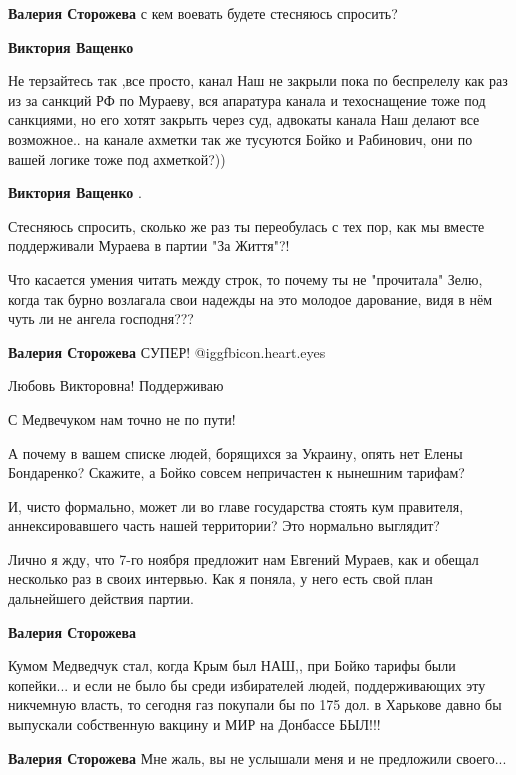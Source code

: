 \begin{itemize}
\begin{itemize}
\textbf{Валерия Сторожева} с кем воевать будете стесняюсь спросить?

\textbf{Виктория Ващенко} 

Не терзайтесь так ,все просто, канал Наш не закрыли пока по беспрелелу как раз
из за санкций РФ по Мураеву, вся апаратура канала и техоснащение тоже под
санкциями, но его хотят закрыть через суд, адвокаты канала Наш делают все
возможное.. на канале ахметки так же тусуются Бойко и Рабинович, они по вашей
логике тоже под ахметкой?))

\textbf{Виктория Ващенко} .

Стесняюсь спросить, сколько же раз ты переобулась с тех пор, как мы вместе
поддерживали Мураева в партии "За Життя"?!

Что касается умения читать между строк, то почему ты не "прочитала" Зелю, когда
так бурно возлагала свои надежды на это молодое дарование, видя в нём чуть ли не
ангела господня???

\textbf{Валерия Сторожева} СУПЕР! @igg{fbicon.heart.eyes} 

\end{itemize} %

Любовь Викторовна! Поддерживаю

С Медвечуком нам точно не по пути!


А почему в вашем списке людей, борящихся за Украину, опять нет Елены Бондаренко?
Скажите, а Бойко совсем непричастен к нынешним тарифам?

И, чисто формально, может ли во главе государства стоять кум
правителя, аннексировавшего часть нашей территории? Это нормально выглядит? 

Лично я жду, что 7-го ноября предложит нам Евгений Мураев, как и обещал несколько
раз в своих интервью. Как я поняла, у него есть свой план дальнейшего действия
партии.

\begin{itemize} %
\textbf{Валерия Сторожева} 

Кумом Медведчук стал, когда Крым был НАШ,, при Бойко тарифы были копейки... и
если не было бы среди избирателей людей, поддерживающих эту никчемную власть,
то сегодня газ покупали бы по 175 дол. в Харькове давно бы выпускали
собственную вакцину и МИР на Донбассе БЫЛ!!!

\textbf{Валерия Сторожева} Мне жаль, вы не услышали меня и не предложили своего...


\end{itemize}
\end{itemize}
